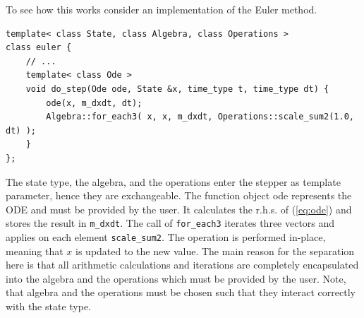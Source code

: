 \documentclass[final]{siamltex}
\newcommand{\code}[1]{\lstinline|#1|}
\newcommand{\eqref}[1]{(\ref{#1})}
\begin{document}
To see how this works consider an implementation of the Euler method.
\begin{lstlisting}
template< class State, class Algebra, class Operations >
class euler {
    // ...
    template< class Ode >
    void do_step(Ode ode, State &x, time_type t, time_type dt) {
        ode(x, m_dxdt, dt);
        Algebra::for_each3( x, x, m_dxdt, Operations::scale_sum2(1.0, dt) );
    }
};
\end{lstlisting}
The state type, the algebra, and the operations enter the stepper as
template parameter, hence they are exchangeable. The function object
ode represents the ODE and must be provided by the user. It calculates
the r.h.s. of \eqref{eq:ode} and stores the result in
\code{m_dxdt}. The call of \code{for_each3} iterates three vectors and
applies on each element \code{scale_sum2}. The operation is performed
in-place, meaning that $x$ is updated to the new value. The main
reason for the separation here is that all arithmetic calculations and
iterations are completely encapsulated into the algebra and the
operations which must be provided by the user. Note, that algebra and
the operations must be chosen such that they interact correctly with
the state type.


\end{document}
